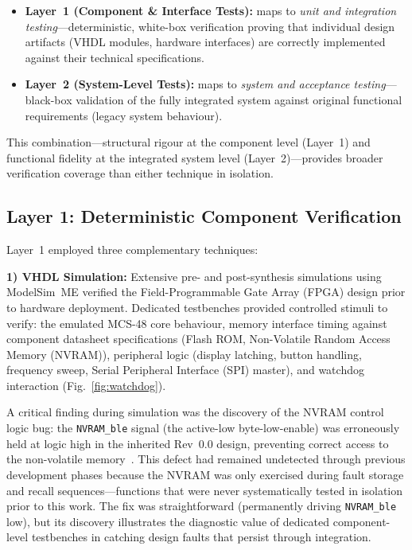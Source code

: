 \documentclass[journal, a4paper]{IEEEtran}
\newcommand{\VHDL}{VHDL}
\newif\iffirstFPGA  \firstFPGAtrue
\newcommand{\FPGA}{\iffirstFPGA Field-Programmable Gate Array (FPGA)\global\firstFPGAfalse\else FPGA\fi}
\newif\iffirstSPI   \firstSPItrue
\newcommand{\SPI}{\iffirstSPI Serial Peripheral Interface (SPI)\global\firstSPIfalse\else SPI\fi}
\newif\iffirstNVRAM \firstNVRAMtrue
\newcommand{\NVRAM}{\iffirstNVRAM Non-Volatile Random Access Memory (NVRAM)\global\firstNVRAMfalse\else NVRAM\fi}
\begin{document}
\begin{itemize}[nosep]
  \item \textbf{Layer~1 (Component \& Interface Tests):} maps to \textit{unit and integration testing}---deterministic, white-box verification proving that individual design artifacts (\VHDL{} modules, hardware interfaces) are correctly implemented against their technical specifications.
  \item \textbf{Layer~2 (System-Level Tests):} maps to \textit{system and acceptance testing}---black-box validation of the fully integrated system against original functional requirements (legacy system behaviour).
\end{itemize}

This combination---structural rigour at the component level (Layer~1) and functional fidelity at the integrated system level (Layer~2)---provides broader verification coverage than either technique in isolation.

\subsection{Layer 1: Deterministic Component Verification}
\label{sec:layer1}

Layer~1 employed three complementary techniques:

\textbf{1) \VHDL{} Simulation:} Extensive pre- and post-synthesis simulations using ModelSim~ME verified the \FPGA{} design prior to hardware deployment. Dedicated testbenches provided controlled stimuli to verify: the emulated MCS-48 core behaviour, memory interface timing against component datasheet specifications (Flash ROM, \NVRAM{}), peripheral logic (display latching, button handling, frequency sweep, \SPI{} master), and watchdog interaction (Fig.~\ref{fig:watchdog}).

A critical finding during simulation was the discovery of the \NVRAM{} control logic bug: the \texttt{NVRAM\_ble} signal (the active-low byte-low-enable) was erroneously held at logic high in the inherited Rev~0.0 design, preventing correct access to the non-volatile memory~\cite{savchuk2025}. This defect had remained undetected through previous development phases because the \NVRAM{} was only exercised during fault storage and recall sequences---functions that were never systematically tested in isolation prior to this work. The fix was straightforward (permanently driving \texttt{NVRAM\_ble} low), but its discovery illustrates the diagnostic value of dedicated component-level testbenches in catching design faults that persist through integration.
\end{document}
